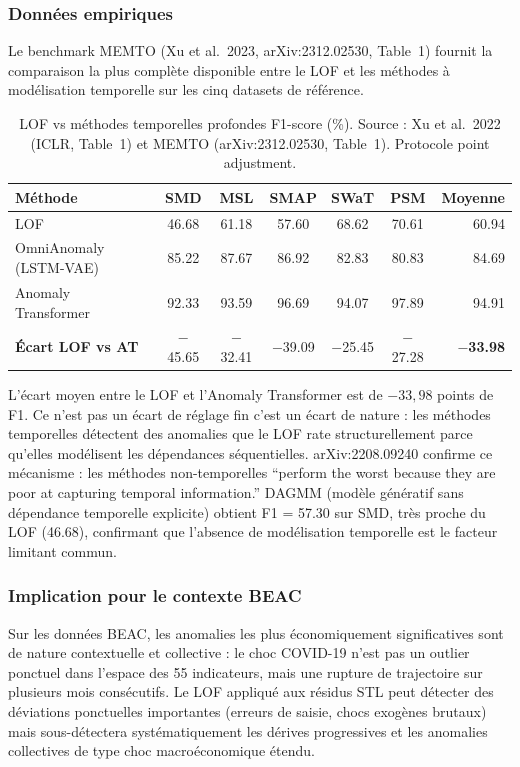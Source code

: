 \documentclass[12pt,a4paper]{article}
\begin{document}
\subsubsection{Données empiriques}

Le benchmark MEMTO (Xu et al.\ 2023, arXiv:2312.02530, Table~1) fournit la
comparaison la plus complète disponible entre le LOF et les méthodes à
modélisation temporelle sur les cinq datasets de référence.

\begin{table}[ht]
\centering
\caption{LOF vs méthodes temporelles profondes  F1-score (\%).
Source : Xu et al.\ 2022 (ICLR, Table~1) et MEMTO (arXiv:2312.02530,
Table~1). Protocole point adjustment.}
\label{tab:l1-benchmark}
\small
\begin{tabular}{lcccccr}
\toprule
\textbf{Méthode} & \textbf{SMD} & \textbf{MSL} & \textbf{SMAP} &
\textbf{SWaT} & \textbf{PSM} & \textbf{Moyenne} \\
\midrule
LOF & 46.68 & 61.18 & 57.60 & 68.62 & 70.61 & 60.94 \\
OmniAnomaly (LSTM-VAE) & 85.22 & 87.67 & 86.92 & 82.83 & 80.83 & 84.69 \\
Anomaly Transformer & 92.33 & 93.59 & 96.69 & 94.07 & 97.89 & 94.91 \\
\midrule
\textbf{Écart LOF vs AT} &
$-$45.65 & $-$32.41 & $-$39.09 & $-$25.45 & $-$27.28 &
\textbf{$-$33.98} \\
\bottomrule
\end{tabular}
\end{table}

L'écart moyen entre le LOF et l'Anomaly Transformer est de $-33{,}98$ points
de F1. Ce n'est pas un écart de réglage fin  c'est un écart de nature :
les méthodes temporelles détectent des anomalies que le LOF rate
structurellement parce qu'elles modélisent les dépendances séquentielles.
arXiv:2208.09240 confirme ce mécanisme : les méthodes non-temporelles
``perform the worst because they are poor at capturing temporal information.''
DAGMM (modèle génératif sans dépendance temporelle explicite) obtient
F1 = 57.30 sur SMD, très proche du LOF (46.68), confirmant que l'absence
de modélisation temporelle est le facteur limitant commun.

\subsubsection{Implication pour le contexte BEAC}

Sur les données BEAC, les anomalies les plus économiquement significatives
sont de nature contextuelle et collective : le choc COVID-19 n'est pas un
outlier ponctuel dans l'espace des 55 indicateurs, mais une rupture de
trajectoire sur plusieurs mois consécutifs. Le LOF appliqué aux résidus STL
peut détecter des déviations ponctuelles importantes (erreurs de saisie,
chocs exogènes brutaux) mais sous-détectera systématiquement les dérives
progressives et les anomalies collectives de type choc macroéconomique étendu.
\end{document}
